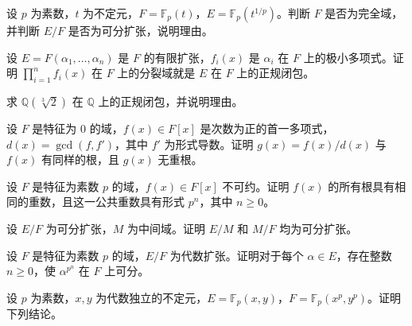 \noindent\begin{minipage}{\textwidth}
设 $p$ 为素数，$t$ 为不定元，$F=\mathbb F_p(t)$，$E=\mathbb F_p(t^{1/p})$。判断 $F$ 是否为完全域，并判断 $E/F$ 是否为可分扩张，说明理由。
\end{minipage}\par\vfill
\noindent\begin{minipage}{\textwidth}
设 $E=F(\alpha_1,\ldots,\alpha_n)$ 是 $F$ 的有限扩张，$f_i(x)$ 是 $\alpha_i$ 在 $F$ 上的极小多项式。证明 $\prod_{i=1}^n f_i(x)$ 在 $F$ 上的分裂域就是 $E$ 在 $F$ 上的正规闭包。
\end{minipage}\par\vfill
\noindent\begin{minipage}{\textwidth}
求 $\mathbb Q(\sqrt[3]{2})$ 在 $\mathbb Q$ 上的正规闭包，并说明理由。
\end{minipage}\par\vfill
\newpage
\noindent\begin{minipage}{\textwidth}
设 $F$ 是特征为 $0$ 的域，$f(x)\in F[x]$ 是次数为正的首一多项式，$d(x)=\gcd(f,f')$，其中 $f'$ 为形式导数。证明 $g(x)=f(x)/d(x)$ 与 $f(x)$ 有同样的根，且 $g(x)$ 无重根。
\end{minipage}\par\vfill
\noindent\begin{minipage}{\textwidth}
设 $F$ 是特征为素数 $p$ 的域，$f(x)\in F[x]$ 不可约。证明 $f(x)$ 的所有根具有相同的重数，且这一公共重数具有形式 $p^n$，其中 $n\ge 0$。
\end{minipage}\par\vfill
\noindent\begin{minipage}{\textwidth}
设 $E/F$ 为可分扩张，$M$ 为中间域。证明 $E/M$ 和 $M/F$ 均为可分扩张。
\end{minipage}\par\vfill
\newpage
\noindent\begin{minipage}{\textwidth}
设 $F$ 是特征为素数 $p$ 的域，$E/F$ 为代数扩张。证明对于每个 $\alpha\in E$，存在整数 $n\ge 0$，使 $\alpha^{p^n}$ 在 $F$ 上可分。
\end{minipage}\par\vfill
\noindent\begin{minipage}{\textwidth}
设 $p$ 为素数，$x,y$ 为代数独立的不定元，$E=\mathbb F_p(x,y)$，$F=\mathbb F_p(x^p,y^p)$。证明下列结论。
\end{minipage}\par\vfill
